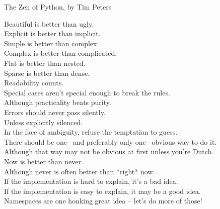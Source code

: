 \begin{frame}[plain]{}

  \LARGE The Zen of Python, \small by Tim Peters

  \normalsize 
  Beautiful is better than ugly. \\
  Explicit is better than implicit. \\
  Simple is better than complex. \\
  Complex is better than complicated. \\
  Flat is better than nested. \\
  Sparse is better than dense. \\
  Readability counts. \\
  Special cases aren't special enough to break the rules. \\
  Although practicality beats purity. \\
  Errors should never pass silently. \\
  Unless explicitly silenced.\\
  In the face of ambiguity, refuse the temptation to guess.\\
  There should be one-- and preferably only one --obvious way to do it.\\
  Although that way may not be obvious at first unless you're Dutch.\\
  Now is better than never.\\
  Although never is often better than *right* now.\\
  If the implementation is hard to explain, it's a bad idea.\\
  If the implementation is easy to explain, it may be a good idea.\\
  Namespaces are one honking great idea -- let's do more of those!\\
\end{frame}

